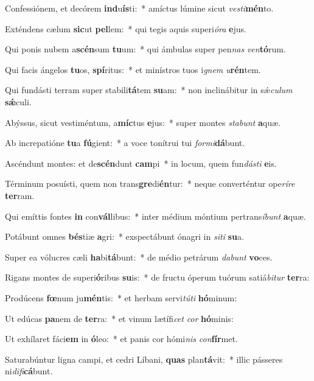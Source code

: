 \item Confessiónem, et decórem \textbf{ind}u\textbf{ís}ti:~* amíctus lúmine sicut \textit{ves}\textit{ti}\textbf{mén}to.
\item Exténdens cælum \textbf{sic}ut \textbf{pel}lem:~* qui tegis aquis superi\textit{ó}\textit{ra} \textbf{e}jus.
\item Qui ponis nubem a\textbf{scén}sum \textbf{tu}um:~* qui ámbulas super pen\textit{nas} \textit{ven}\textbf{tó}rum.
\item Qui facis ángelos \textbf{tu}os, \textbf{spí}ritus:~* et minístros tuos i\textit{gnem} \textit{u}\textbf{rén}tem.
\item Qui fundásti terram super stabili\textbf{tá}tem \textbf{su}am:~* non inclinábitur in sǽ\textit{cu}\textit{lum} \textbf{sǽ}culi.
\item Abýssus, sicut vestiméntum, a\textbf{míc}tus \textbf{e}jus:~* super montes \textit{sta}\textit{bunt} \textbf{a}quæ.
\item Ab increpatióne \textbf{tu}a \textbf{fú}gient:~* a voce tonítrui tui \textit{for}\textit{mi}\textbf{dá}bunt.
\item Ascéndunt montes: et de\textbf{scén}dunt \textbf{cam}pi~* in locum, quem fun\textit{dás}\textit{ti} \textbf{e}is.
\item Términum posuísti, quem non trans\textbf{gre}di\textbf{én}tur:~* neque converténtur ope\textit{rí}\textit{re} \textbf{ter}ram.
\item Qui emíttis fontes \textbf{in} con\textbf{vál}libus:~* inter médium móntium pertrans\textit{í}\textit{bunt} \textbf{a}quæ.
\item Potábunt omnes \textbf{bés}tiæ \textbf{a}gri:~* exspectábunt ónagri in \textit{si}\textit{ti} \textbf{su}a.
\item Super ea vólucres cæli \textbf{ha}bi\textbf{tá}bunt:~* de médio petrárum \textit{da}\textit{bunt} \textbf{vo}ces.
\item Rigans montes de superi\textbf{ó}ribus \textbf{su}is:~* de fructu óperum tuórum satiá\textit{bi}\textit{tur} \textbf{ter}ra:
\item Prodúcens \textbf{fœ}num ju\textbf{mén}tis:~* et herbam servi\textit{tú}\textit{ti} \textbf{hó}minum:
\item Ut edúcas \textbf{pa}nem de \textbf{ter}ra:~* et vinum lætífi\textit{cet} \textit{cor} \textbf{hó}minis:
\item Ut exhílaret fáci\textbf{em} in \textbf{ó}leo:~* et panis cor hómi\textit{nis} \textit{con}\textbf{fír}met.
\item Saturabúntur ligna campi, et cedri Líbani, \textbf{quas} plan\textbf{tá}vit:~* illic pásseres ni\textit{di}\textit{fi}\textbf{cá}bunt.

